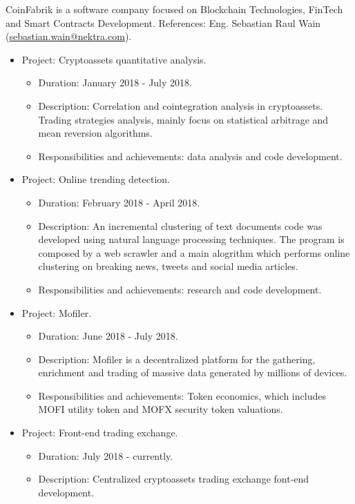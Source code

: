 \documentclass[11pt,a4paper,sans]{moderncv}        %
\begin{document}
{CoinFabrik is a software company focused on Blockchain Technologies, FinTech and Smart Contracts Development.
References: Eng. Sebastian Raul Wain (\href{mailto:sebastian.wain@nektra.com}{sebastian.wain@nektra.com}).
\begin{itemize}%
\item Project: Cryptoassets quantitative analysis.
	\begin{itemize}%
	\item Duration: January 2018 - July 2018.
	\item Description: Correlation and cointegration analysis in cryptoassets. 
	Trading strategies analysis, mainly focus on statistical arbitrage and mean reversion algorithms.
	\item Responsibilities and achievements: data analysis and code development.
	\end{itemize}
\item Project: Online trending detection.
	\begin{itemize}%
	\item Duration: February 2018 - April 2018.
	\item Description: An incremental clustering of text documents code was developed using natural language processing techniques.
	The program is composed by a web scrawler and a main alogrithm which performs online clustering on breaking news,
	tweets and social media articles.
	\item Responsibilities and achievements: research and code development.
	\end{itemize}
\item Project: Mofiler.
	\begin{itemize}%
	\item Duration: June 2018 - July 2018.
	\item Description: Mofiler is a decentralized platform for the gathering, enrichment and trading of
	massive data generated by millions of devices.
	\item Responsibilities and achievements: Token economics, which includes MOFI utility token and MOFX security token valuations.
	\end{itemize}
\item Project: Front-end trading exchange.
	\begin{itemize}%
	\item Duration: July 2018 - currently.
	\item Description: Centralized cryptoassets trading exchange font-end development.

\end{itemize}
\end{itemize}}
\end{document}

